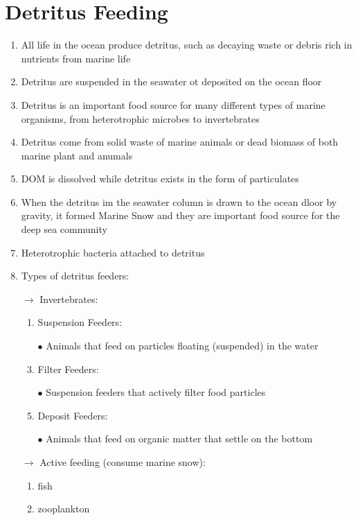 \documentclass{report}
\begin{document}
\section{Detritus Feeding}
\begin{enumerate}
    \item All life in the ocean produce detritus, such as decaying waste or debris rich in nutrients from marine life
    \item Detritus are suspended in the seawater ot deposited on the ocean floor
    \item Detritus is an important food source for many different types of marine organisms, from heterotrophic microbes to invertebrates
    \item Detritus come from solid waste of marine animals or dead biomass of both marine plant and anumals
    \item DOM is dissolved while detritus exists in the form of particulates
    \item When the detritus im the seawater column is drawn to the ocean dloor by gravity, it formed Marine Snow and they are important food source for the deep sea community
    \item Heterotrophic bacteria attached to detritus 
    \item Types of detritus feeders:
    \item [$\rightarrow$]Invertebrates:
    \begin{enumerate}
        \item Suspension Feeders:
        \item [$\bullet$]Animals that feed on particles floating (suspended) in the water
        \item Filter Feeders:
        \item [$\bullet$]Suspension feeders that actively filter food particles
        \item Deposit Feeders:
        \item [$\bullet$]Animals that feed on organic matter that settle on the bottom
    \end{enumerate}
    \item [$\rightarrow$]Active feeding (consume marine snow):
    \begin{enumerate}
        \item fish
        \item zooplankton
    \end{enumerate}
\end{enumerate}
\end{document}
